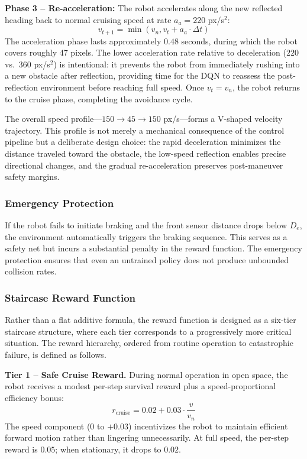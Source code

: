 \documentclass[conference]{IEEEtran}
\begin{document}
\textbf{Phase 3 -- Re-acceleration:} The robot accelerates along the new reflected heading back to normal cruising speed at rate $a_a = 220$ px/s$^2$:
\begin{equation}
    v_{t+1} = \min(v_n, v_t + a_a \cdot \Delta t)
\end{equation}
The acceleration phase lasts approximately $0.48$ seconds, during which the robot covers roughly 47 pixels. The lower acceleration rate relative to deceleration ($220$ vs.\ $360$ px/s$^2$) is intentional: it prevents the robot from immediately rushing into a new obstacle after reflection, providing time for the DQN to reassess the post-reflection environment before reaching full speed. Once $v_t = v_n$, the robot returns to the cruise phase, completing the avoidance cycle.

The overall speed profile---$150 \rightarrow 45 \rightarrow 150$ px/s---forms a V-shaped velocity trajectory. This profile is not merely a mechanical consequence of the control pipeline but a deliberate design choice: the rapid deceleration minimizes the distance traveled toward the obstacle, the low-speed reflection enables precise directional changes, and the gradual re-acceleration preserves post-maneuver safety margins.

\subsubsection{Emergency Protection}

If the robot fails to initiate braking and the front sensor distance drops below $D_e$, the environment automatically triggers the braking sequence. This serves as a safety net but incurs a substantial penalty in the reward function. The emergency protection ensures that even an untrained policy does not produce unbounded collision rates.

\subsubsection{Staircase Reward Function}

Rather than a flat additive formula, the reward function is designed as a six-tier staircase structure, where each tier corresponds to a progressively more critical situation. The reward hierarchy, ordered from routine operation to catastrophic failure, is defined as follows.

\textbf{Tier 1 -- Safe Cruise Reward.} During normal operation in open space, the robot receives a modest per-step survival reward plus a speed-proportional efficiency bonus:
\begin{equation}
    r_{\text{cruise}} = 0.02 + 0.03 \cdot \frac{v}{v_n}
\end{equation}
The speed component ($0$ to $+0.03$) incentivizes the robot to maintain efficient forward motion rather than lingering unnecessarily. At full speed, the per-step reward is $0.05$; when stationary, it drops to $0.02$.
\end{document}
